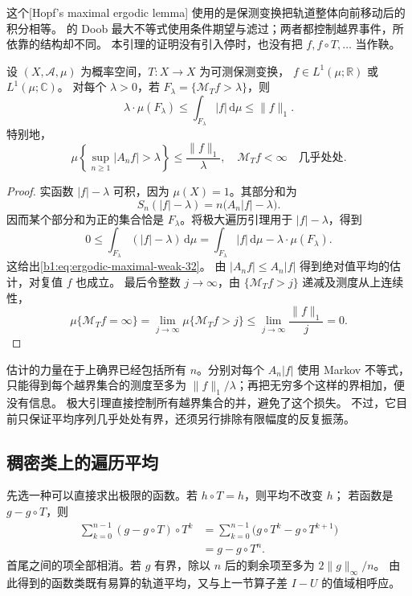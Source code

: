 这个[Hopf's maximal ergodic lemma]
使用的是保测变换把轨道整体向前移动后的积分相等。
的 Doob 最大不等式使用条件期望与滤过；两者都控制越界事件，所依靠的结构却不同。
本引理的证明没有引入停时，也没有把 \(f,f\circ T,\ldots\) 当作鞅。

\begin{proposition}[遍历平均的极大函数的弱型估计]
\label{b1:prop:ergodic-maximal-weak-32}
设 \((X,\mathcal A,\mu)\) 为概率空间，\(T:X\to X\) 为可测保测变换，
\(f\in L^1(\mu;\mathbb R)\) 或 \(L^1(\mu;\mathbb C)\)。
对每个 \(\lambda>0\)，若 \(F_\lambda=\{\mathcal M_Tf>\lambda\}\)，则
\begin{equation}
 \lambda\cdot\mu(F_\lambda)
 \leq\int_{F_\lambda}|f|\,\mathrm d\mu
 \leq\|f\|_1.
 \label{b1:eq:ergodic-maximal-weak-32}
\end{equation}
特别地，
\[
 \mu\left\{\sup_{n\geq1}|A_nf|>\lambda\right\}
 \leq\frac{\|f\|_1}{\lambda},
 \quad \mathcal M_Tf<\infty\quad\text{几乎处处}.
\]
\end{proposition}
\begin{proof}
实函数 \(|f|-\lambda\) 可积，因为 \(\mu(X)=1\)。其部分和为
\[
 S_n(|f|-\lambda)=n\bigl(A_n|f|-\lambda\bigr).
\]
因而某个部分和为正的集合恰是 \(F_\lambda\)。将极大遍历引理用于 \(|f|-\lambda\)，得到
\[
 0\leq\int_{F_\lambda}(|f|-\lambda)\,\mathrm d\mu
   =\int_{F_\lambda}|f|\,\mathrm d\mu-\lambda\cdot\mu(F_\lambda).
\]
这给出\eqref{b1:eq:ergodic-maximal-weak-32}。
由 \(|A_nf|\leq A_n|f|\) 得到绝对值平均的估计，对复值 \(f\) 也成立。
最后令整数 \(j\to\infty\)，由 \(\{\mathcal M_Tf>j\}\) 递减及测度从上连续性，
\[
 \mu\{\mathcal M_Tf=\infty\}
 =\lim_{j\to\infty}\mu\{\mathcal M_Tf>j\}
 \leq\lim_{j\to\infty}\frac{\|f\|_1}{j}=0.
\]
\end{proof}

估计的力量在于上确界已经包括所有 \(n\)。分别对每个 \(A_n|f|\) 使用 Markov 不等式，
只能得到每个越界集合的测度至多为 \(\|f\|_1/\lambda\)；再把无穷多个这样的界相加，便没有信息。
极大引理直接控制所有越界集合的并，避免了这个损失。
不过，它目前只保证平均序列几乎处处有界，还须另行排除有限幅度的反复振荡。

\subsection{稠密类上的遍历平均}
\label{b1:subsec:320303}

先选一种可以直接求出极限的函数。若 \(h\circ T=h\)，则平均不改变 \(h\)；
若函数是 \(g-g\circ T\)，则
\[
 \begin{aligned}
 \sum_{k=0}^{n-1}(g-g\circ T)\circ T^k
 &=\sum_{k=0}^{n-1}\bigl(g\circ T^k-g\circ T^{k+1}\bigr)\\
 &=g-g\circ T^n.
 \end{aligned}
\]
首尾之间的项全部相消。若 \(g\) 有界，除以 \(n\) 后的剩余项至多为 \(2\|g\|_\infty/n\)。
由此得到的函数类既有易算的轨道平均，又与上一节算子差 \(I-U\) 的值域相呼应。

